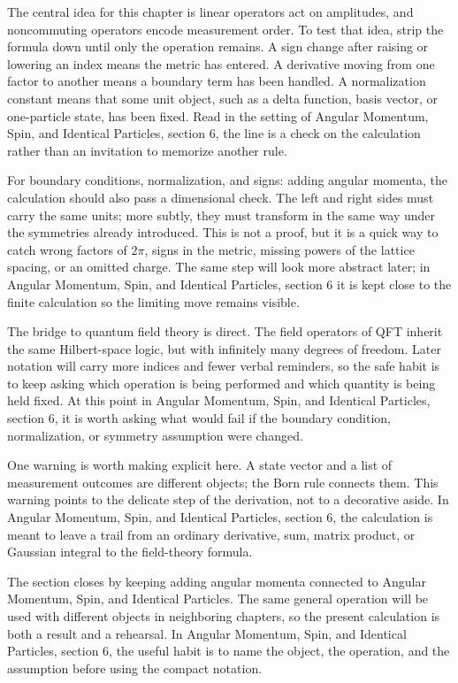 The central idea for this chapter is linear operators act on amplitudes, and noncommuting operators encode measurement order.  To test that idea, strip the formula down until only the operation remains.  A sign change after raising or lowering an index means the metric has entered.  A derivative moving from one factor to another means a boundary term has been handled.  A normalization constant means that some unit object, such as a delta function, basis vector, or one-particle state, has been fixed.  Read in the setting of Angular Momentum, Spin, and Identical Particles, section 6, the line is a check on the calculation rather than an invitation to memorize another rule.

For boundary conditions, normalization, and signs: adding angular momenta, the calculation should also pass a dimensional check.  The left and right sides must carry the same units; more subtly, they must transform in the same way under the symmetries already introduced.  This is not a proof, but it is a quick way to catch wrong factors of \(2\pi\), signs in the metric, missing powers of the lattice spacing, or an omitted charge.  The same step will look more abstract later; in Angular Momentum, Spin, and Identical Particles, section 6 it is kept close to the finite calculation so the limiting move remains visible.

The bridge to quantum field theory is direct.  The field operators of QFT inherit the same Hilbert-space logic, but with infinitely many degrees of freedom.  Later notation will carry more indices and fewer verbal reminders, so the safe habit is to keep asking which operation is being performed and which quantity is being held fixed.  At this point in Angular Momentum, Spin, and Identical Particles, section 6, it is worth asking what would fail if the boundary condition, normalization, or symmetry assumption were changed.

One warning is worth making explicit here.  A state vector and a list of measurement outcomes are different objects; the Born rule connects them.  This warning points to the delicate step of the derivation, not to a decorative aside.  In Angular Momentum, Spin, and Identical Particles, section 6, the calculation is meant to leave a trail from an ordinary derivative, sum, matrix product, or Gaussian integral to the field-theory formula.

The section closes by keeping adding angular momenta connected to Angular Momentum, Spin, and Identical Particles.  The same general operation will be used with different objects in neighboring chapters, so the present calculation is both a result and a rehearsal.  In Angular Momentum, Spin, and Identical Particles, section 6, the useful habit is to name the object, the operation, and the assumption before using the compact notation.



